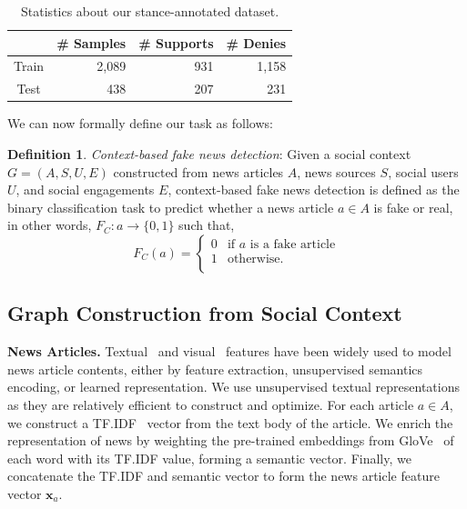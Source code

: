 \documentclass[sigconf]{acmart}
\theoremstyle{definition}
\newtheorem{definition}{Definition}[section]
\theoremstyle{hypothesis}
\begin{document}
\begin{table}[t]
  \centering
  \small
  \caption{Statistics about our stance-annotated dataset.}
  \begin{tabular}{crrr}
  \toprule
     & \bf \# Samples & \bf \# Supports & \bf \# Denies \\ 
    \midrule
  Train & 2,089 & 931 & 1,158 \\
  Test & 438 & 207 & 231 \\ 
  \bottomrule
  \end{tabular}
  \label{table:stance_statistics}
\end{table}

We can now formally define our task as follows: 
\begin{definition}{\textit{Context-based fake news detection}}: Given a social context $G = (A,S,U,E)$ constructed from news articles $A$, news sources $S$, social users $U$, and social engagements $E$, context-based fake news detection is defined as the binary classification task to predict whether a news article $a\in A$ is fake or real, in other words,
$F_C : a \rightarrow \{0,1\}$ such that,
\[  F_C(a) = \left\{
\begin{array}{ll}
      0 & \textrm{if } a \textrm{ is a fake article} \\
      1 & \textrm{otherwise}. \\
\end{array} 
\right. \]
\end{definition}

\subsection{Graph Construction from Social Context}
\label{sec:graph_construction}

\textbf{News Articles.} Textual~\cite{castillo2011information,yang2012automatic,shu2019beyond,popat2018credeye} and visual~\cite{wang2018eann,khattar2019mvae} features have been widely used to model news article contents, either by feature extraction, unsupervised semantics encoding, or learned representation.
We use unsupervised textual representations as they are relatively efficient to construct and optimize.
For each article $a\in A$, we construct a 
TF.IDF~\cite{Salton83} vector 
from the text body of the article. 
We enrich the representation of news by weighting the pre-trained embeddings from GloVe~\cite{pennington2014glove} of each word with its TF.IDF value, forming a semantic vector. Finally, we concatenate the TF.IDF and semantic vector to form the news article feature vector $\boldsymbol{x}_a$.
\end{document}

